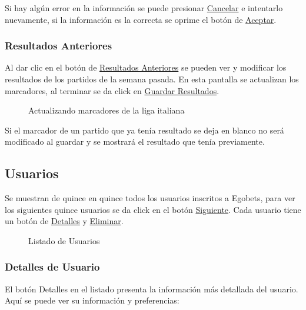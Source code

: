 Si hay algún error en la información se puede presionar \underline{Cancelar} e intentarlo nuevamente, si la información es la correcta se oprime el botón de \underline{Aceptar}.


\subsubsection{Resultados Anteriores}

Al dar clic en el botón de \underline{Resultados Anteriores} se pueden ver y modificar los resultados de los partidos de la semana pasada. En esta pantalla se actualizan los marcadores, al terminar se da click en \underline{Guardar Resultados}.

\begin{figure}[!htb]\centering
   \begin {minipage}{0.64\textwidth}
     \caption[Actualizar resultados Anteriores]{Actualizando marcadores de la liga italiana}
	 \label{Fig:Resultados-anteriores}
   \end{minipage}
\end{figure}

Si el marcador de un partido que ya tenía resultado se deja en blanco no será modificado al guardar y se mostrará el resultado que tenía previamente.

\subsection{Usuarios}

Se muestran de quince en quince todos los usuarios inscritos a Egobets, para ver los siguientes quince usuarios se da click en el botón \underline{Siguiente}. Cada usuario tiene un botón de \underline{Detalles} y \underline{Eliminar}.
\begin{figure}[!htb]\centering
   \begin {minipage}{1\textwidth}
     \caption{Listado de Usuarios}
	 \label{Fig:usuarios}
   \end{minipage}
\end{figure}

\subsubsection{Detalles de Usuario}

El botón Detalles en el listado presenta la información más detallada del usuario. Aquí se puede ver su información y preferencias:

